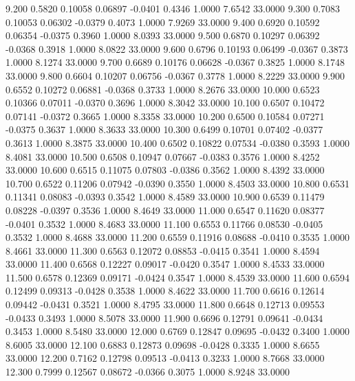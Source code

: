    9.200   0.5820   0.10058   0.06897  -0.0401   0.4346   1.0000   7.6542  33.0000
   9.300   0.7083   0.10053   0.06302  -0.0379   0.4073   1.0000   7.9269  33.0000
   9.400   0.6920   0.10592   0.06354  -0.0375   0.3960   1.0000   8.0393  33.0000
   9.500   0.6870   0.10297   0.06392  -0.0368   0.3918   1.0000   8.0822  33.0000
   9.600   0.6796   0.10193   0.06499  -0.0367   0.3873   1.0000   8.1274  33.0000
   9.700   0.6689   0.10176   0.06628  -0.0367   0.3825   1.0000   8.1748  33.0000
   9.800   0.6604   0.10207   0.06756  -0.0367   0.3778   1.0000   8.2229  33.0000
   9.900   0.6552   0.10272   0.06881  -0.0368   0.3733   1.0000   8.2676  33.0000
  10.000   0.6523   0.10366   0.07011  -0.0370   0.3696   1.0000   8.3042  33.0000
  10.100   0.6507   0.10472   0.07141  -0.0372   0.3665   1.0000   8.3358  33.0000
  10.200   0.6500   0.10584   0.07271  -0.0375   0.3637   1.0000   8.3633  33.0000
  10.300   0.6499   0.10701   0.07402  -0.0377   0.3613   1.0000   8.3875  33.0000
  10.400   0.6502   0.10822   0.07534  -0.0380   0.3593   1.0000   8.4081  33.0000
  10.500   0.6508   0.10947   0.07667  -0.0383   0.3576   1.0000   8.4252  33.0000
  10.600   0.6515   0.11075   0.07803  -0.0386   0.3562   1.0000   8.4392  33.0000
  10.700   0.6522   0.11206   0.07942  -0.0390   0.3550   1.0000   8.4503  33.0000
  10.800   0.6531   0.11341   0.08083  -0.0393   0.3542   1.0000   8.4589  33.0000
  10.900   0.6539   0.11479   0.08228  -0.0397   0.3536   1.0000   8.4649  33.0000
  11.000   0.6547   0.11620   0.08377  -0.0401   0.3532   1.0000   8.4683  33.0000
  11.100   0.6553   0.11766   0.08530  -0.0405   0.3532   1.0000   8.4688  33.0000
  11.200   0.6559   0.11916   0.08688  -0.0410   0.3535   1.0000   8.4661  33.0000
  11.300   0.6563   0.12072   0.08853  -0.0415   0.3541   1.0000   8.4594  33.0000
  11.400   0.6568   0.12227   0.09017  -0.0420   0.3547   1.0000   8.4533  33.0000
  11.500   0.6578   0.12369   0.09171  -0.0424   0.3547   1.0000   8.4539  33.0000
  11.600   0.6594   0.12499   0.09313  -0.0428   0.3538   1.0000   8.4622  33.0000
  11.700   0.6616   0.12614   0.09442  -0.0431   0.3521   1.0000   8.4795  33.0000
  11.800   0.6648   0.12713   0.09553  -0.0433   0.3493   1.0000   8.5078  33.0000
  11.900   0.6696   0.12791   0.09641  -0.0434   0.3453   1.0000   8.5480  33.0000
  12.000   0.6769   0.12847   0.09695  -0.0432   0.3400   1.0000   8.6005  33.0000
  12.100   0.6883   0.12873   0.09698  -0.0428   0.3335   1.0000   8.6655  33.0000
  12.200   0.7162   0.12798   0.09513  -0.0413   0.3233   1.0000   8.7668  33.0000
  12.300   0.7999   0.12567   0.08672  -0.0366   0.3075   1.0000   8.9248  33.0000
